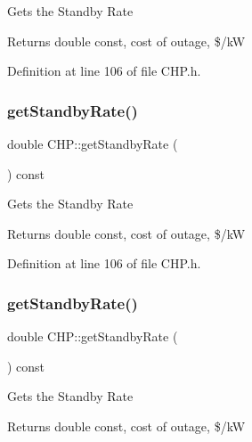 Gets the Standby Rate

\begin{DoxyReturn}{Returns}
double const, cost of outage, \$/kW 
\end{DoxyReturn}


Definition at line 106 of file C\+H\+P.\+h.

\mbox{\label{class_c_h_p_a195f0ffe163404077b56a5e5db8eb59c}} 
\subsubsection{\texorpdfstring{get\+Standby\+Rate()}{getStandbyRate()}\hspace{0.1cm}{\footnotesize\ttfamily [2/3]}}
{\footnotesize\ttfamily double C\+H\+P\+::get\+Standby\+Rate (\begin{DoxyParamCaption}{ }\end{DoxyParamCaption}) const\hspace{0.3cm}{\ttfamily [inline]}}

Gets the Standby Rate

\begin{DoxyReturn}{Returns}
double const, cost of outage, \$/kW 
\end{DoxyReturn}


Definition at line 106 of file C\+H\+P.\+h.

\mbox{\label{class_c_h_p_a195f0ffe163404077b56a5e5db8eb59c}} 
\subsubsection{\texorpdfstring{get\+Standby\+Rate()}{getStandbyRate()}\hspace{0.1cm}{\footnotesize\ttfamily [3/3]}}
{\footnotesize\ttfamily double C\+H\+P\+::get\+Standby\+Rate (\begin{DoxyParamCaption}{ }\end{DoxyParamCaption}) const\hspace{0.3cm}{\ttfamily [inline]}}

Gets the Standby Rate

\begin{DoxyReturn}{Returns}
double const, cost of outage, \$/kW 
\end{DoxyReturn}


